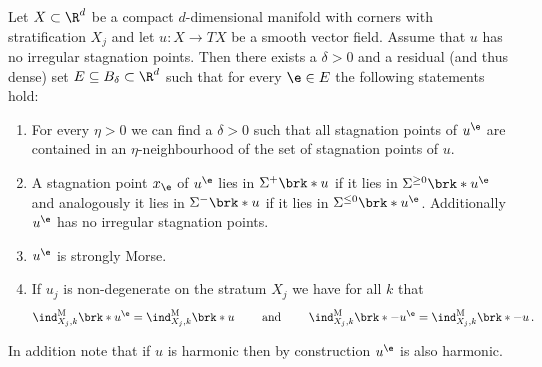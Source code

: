 \begin{corollary}\label{co:density_boundaryGeneric}
  Let $X\subset\R^d$ be a compact $d$-dimensional manifold with corners with stratification $X_j$ and let $u\colon X\to TX$ be a smooth vector field.
  Assume that $u$ has no irregular stagnation points.
  Then there exists a $\delta>0$ and a residual (and thus dense) set $E\subseteq B_\delta\subset\R^d$ such that for every $\e\in E$
  the following statements hold:
  \begin{enumerate}
    \item For every $\eta>0$ we can find a $\delta>0$ such that all stagnation points of $u^\e$ are contained in an 
    $\eta$-neighbourhood of the set of stagnation points of $u$.\label{co:nonDegeneracy_density_etaNbh}
    \item A stagnation point $x_\e$ of $u^\e$ lies in $\Sigma^+\brk*{u}$ if it lies in $\Sigma^{\geq0}\brk*{u^\e}$ 
      and analogously it lies in $\Sigma^-\brk*{u}$ if it lies in $\Sigma^{\leq0}\brk*{u^\e}$. Additionally $u^\e$ has no
      irregular stagnation points.
      \label{co:nonDegeneracy_density_entrEmerg}
    \item $u^\e$ is strongly Morse. \label{co:nonDegeneracy_density_nonDeg}
    \item If $u_j$ is non-degenerate on the stratum $X_j$ we have\label{co:nonDegeneracy_density_index}
    for all $k$ that
    \begin{align*}
      \ind^\text{M}_{X_j,k}\brk*{u^\e}=\ind^\text{M}_{X_j,k}\brk*{u}\qquad\text{ and }\qquad\ind^\text{M}_{X_j,k}\brk*{-u^\e}=\ind^\text{M}_{X_j,k}\brk*{-u}\,.
    \end{align*}
  \end{enumerate}
  In addition note that if $u$ is harmonic then by construction $u^\e$ is also harmonic.
\end{corollary}
